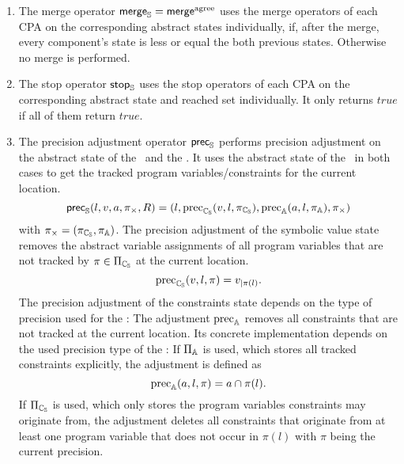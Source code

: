 \begin{enumerate}[leftmargin=*, label=\arabic*.]
\item
The merge operator
	$\operatorname{\operatorname{\mathsf{merge}}}_{\mathbb{S}} = \operatorname{{\operatorname{\operatorname{\mathsf{merge}}}^{agree}}}$ uses the merge operators of each CPA on the corresponding abstract states individually, if, after the merge, every component's state is less or equal the both previous states. Otherwise no merge is performed.

\item
The stop operator $\operatorname{\operatorname{\mathsf{stop}}}_{\mathbb{S}}$
	uses the stop operators of each CPA on the corresponding abstract state and reached set individually. It only returns $true$ if all of them return $true$.

\item
The precision adjustment operator $\operatorname{\operatorname{\mathsf{prec}}}_{\mathbb{S}}$ performs precision adjustment on the abstract state of the \symbolicValueAnalysisCPA\ and the \constraintsCPA.
It uses the abstract state of the \locationCPA\ in both cases to get the tracked program variables/constraints for the current location.
\[ \operatorname{\operatorname{\mathsf{prec}}}_{\mathbb{S}}(l, v, a, \pi_\times, R) = (l, \operatorname{\text{prec}}_{\mathbb{C_{S}}}(v, l, \pi_{\mathbb{C_{S}}}), \operatorname{\text{prec}}_{\mathbb{A}}(a, l, \pi_{\mathbb{A}}), \pi_\times) \]
with $\pi_\times = (\pi_{\mathbb{C_{S}}}, \pi_{\mathbb{A}})$.
The precision adjustment of the symbolic value state removes the abstract variable assignments of all program variables that are not tracked by $\pi \in \Pi_{\mathbb{C_{S}}}$ at the current location.
\[\operatorname{\text{prec}}_{\mathbb{C_{S}}}(v, l, \pi) = v_{|\pi(l)}.\]
The precision adjustment of the constraints state depends on the type of precision used for the \constraintsCPA:
The adjustment $\operatorname{\text{prec}}_{\mathbb{A}}$  removes all constraints that are not tracked at the current location.
Its concrete implementation depends on the used precision type of the \constraintsCPA:
If $\Pi_{\mathbb{A}}$ is used, which stores all tracked constraints explicitly, the adjustment is defined as
\[\operatorname{\text{prec}}_{\mathbb{A}}(a, l, \pi)= a \cap \pi(l).\]
If $\Pi_{\mathbb{C_{S}}}$ is used, which only stores the program variables constraints may originate from, the adjustment deletes all constraints that originate from at least one program variable that does not occur in $\pi(l)$ with $\pi$ being the current precision.
\end{enumerate}
